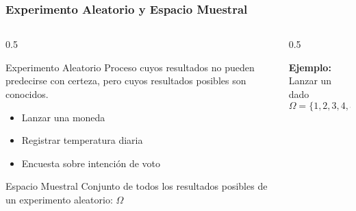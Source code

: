 \documentclass[aspectratio=169,11pt]{beamer}
\begin{document}
\begin{frame}[fragile]
\frametitle{Experimento Aleatorio y Espacio Muestral}

\small

\begin{columns}[T]
\begin{column}{0.5\textwidth}
\begin{block}{Experimento Aleatorio}
Proceso cuyos resultados no pueden predecirse con certeza, pero cuyos resultados posibles son conocidos.
\pause
\begin{itemize}
  \item Lanzar una moneda
  \item Registrar temperatura diaria
  \item Encuesta sobre intención de voto
\end{itemize}
\end{block}

\pause
\begin{block}{Espacio Muestral}
Conjunto de todos los resultados posibles de un experimento aleatorio: $\Omega$
\end{block}
\end{column}

\begin{column}{0.5\textwidth}
\begin{center}
\end{center}

\pause
\textbf{Ejemplo:} Lanzar un dado
$$\Omega = \{1, 2, 3, 4, 5, 6\}, \quad |\Omega| = 6$$
\end{column}
\end{columns}
\end{frame}
\end{document}
